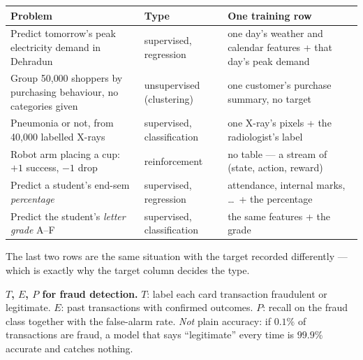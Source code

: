 \documentclass[11pt]{article}
\begin{document}
\begin{worked}
\small
\begin{tabular}{@{}p{5.2cm}p{3.3cm}p{5.6cm}@{}}
\toprule
\textbf{Problem} & \textbf{Type} & \textbf{One training row}\\ \midrule
Predict tomorrow's peak electricity demand in Dehradun & supervised,
regression & one day's weather and calendar features + that day's peak
demand\\[2pt]
Group 50{,}000 shoppers by purchasing behaviour, no categories given &
unsupervised (clustering) & one customer's purchase summary, no target\\[2pt]
Pneumonia or not, from 40{,}000 labelled X-rays & supervised,
classification & one X-ray's pixels + the radiologist's label\\[2pt]
Robot arm placing a cup: $+1$ success, $-1$ drop & reinforcement & no table
--- a stream of (state, action, reward)\\[2pt]
Predict a student's end-sem \emph{percentage} & supervised, regression &
attendance, internal marks, \dots\ + the percentage\\[2pt]
Predict the student's \emph{letter grade} A--F & supervised, classification
& the same features + the grade\\
\bottomrule
\end{tabular}

\normalsize
The last two rows are the same situation with the target recorded
differently --- which is exactly why the target column decides the type.

\textbf{$T$, $E$, $P$ for fraud detection.} $T$: label each card
transaction fraudulent or legitimate. $E$: past transactions with confirmed
outcomes. $P$: recall on the fraud class together with the false-alarm rate.
\emph{Not} plain accuracy: if $0.1\%$ of transactions are fraud, a model that
says ``legitimate'' every time is $99.9\%$ accurate and catches nothing.
\end{worked}
\end{document}

